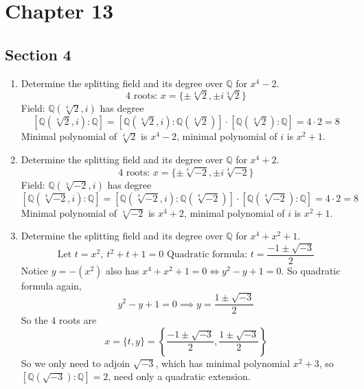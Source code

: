 \documentclass[hidelinks,12pt]{article}
\title{\scalebox{1.5}{Math 835 Homework 4}}
\author{\scalebox{1.5}{Theo Koss}}
\date{September 2024}
\newcommand{\Q}{\mathbb{Q}}
\begin{document}
\maketitle
\section*{Chapter 13}
\subsection*{Section 4}
\begin{enumerate}
    \item Determine the splitting field and its degree over \(\Q\) for \(x^{4}-2\). 
        \[
    4 \text{ roots: }x=\{\pm\sqrt[4]{2},\pm i\sqrt[4]{2}\} 
        \]
        Field: \(\Q(\sqrt[4]{2},i)\) has degree
        \[
            [\Q(\sqrt[4]{2},i):\Q]=[\Q(\sqrt[4]{2},i):\Q(\sqrt[4]{2})]\cdot[\Q(\sqrt[4]{2}):\Q]=4\cdot2=8
        \]
        Minimal polynomial of \(\sqrt[4]{2}\) is \(x^{4}-2\), minimal polynomial of \(i\) is \(x^{2}+1\).
        
    \item Determine the splitting field and its degree over \(\Q\) for \(x^{4}+2\). 
        \[
            4 \text{ roots: }x=\{\pm\sqrt[4]{-2},\pm i\sqrt[4]{-2}\}
        \]
        Field: \(\Q(\sqrt[4]{-2},i)\) has degree \[
            [\Q(\sqrt[4]{-2},i):\Q]=[\Q(\sqrt[4]{-2},i):\Q(\sqrt[4]{-2})]\cdot[\Q(\sqrt[4]{-2}):\Q]=4\cdot2=8
        \]
        Minimal polynomial of \(\sqrt[4]{-2}\) is \(x^{4}+2\), minimal polynomial of \(i\) is \(x^{2}+1\).
    \item Determine the splitting field and its degree over \(\Q\) for \(x^{4}+x^{2}+1\). 
        \[
            \text{Let }t=x^{2},\ t^{2}+t+1=0\text{ Quadratic formula: }t=\frac{-1\pm\sqrt{-3}}{2}
        \]
        Notice \(y=-(x^{2})\) also has \(x^{4}+x^{2}+1=0\iff y^{2}-y+1=0\). So quadratic formula again, \[
            y^{2}-y+1=0\implies y=\frac{1\pm\sqrt{-3}}{2}
        \]
         So the 4 roots are
         \[
             x=\{t,y\}=\left\{\frac{-1\pm\sqrt{-3}}{2}
             ,\frac{1\pm\sqrt{-3}}{2}\right\}
         \]
         So we only need to adjoin \(\sqrt{-3}\), which has minimal polynomial \(x^{2}+3\), so \([\Q(\sqrt{-3}):\Q]=2\), need only a quadratic extension.
\end{enumerate}
\end{document}
